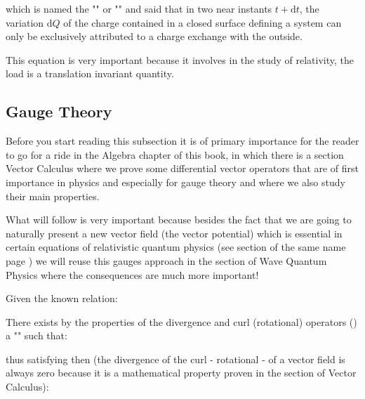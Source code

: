 	which is named the  "" or "" and said that in two near instants $t+\mathrm{d}t$, the variation $\mathrm{d}Q$ of the charge contained in a closed surface defining a system can only be exclusively  attributed to a charge exchange with the outside.
	
	This equation is very important because it involves in the study of relativity, the load is a translation invariant quantity.
	
	\subsection{Gauge Theory}\label{gauge theory}
	Before you start reading this subsection it is of primary importance for the reader to go for a ride in the Algebra chapter of this book, in which there is a section Vector Calculus where we prove some differential vector operators that are of first importance in physics and especially for gauge theory and where we also study their main properties.
	
	What will follow is very important because besides the fact that we are going to naturally present a new vector field (the vector potential) which is essential in certain equations of relativistic quantum physics (see section of the same name page \pageref{relativistic quantum physics}) we will reuse this gauges approach in the section of Wave Quantum Physics where the consequences are much more important!
	
	Given the known relation:
	
	There exists by the properties of the divergence and curl (rotational) operators () a "" such that:
	
	thus satisfying then (the divergence of the curl - rotational - of a vector field is always zero because it is a mathematical property proven in the section of Vector Calculus):
	
